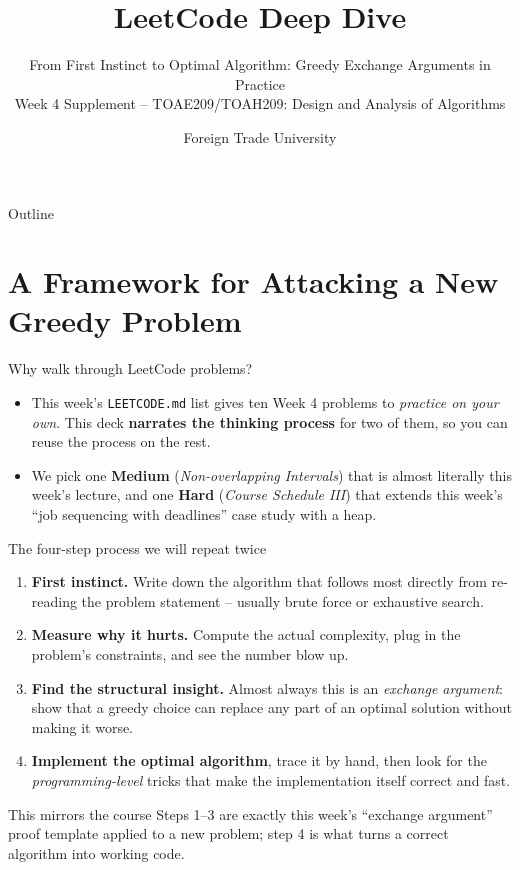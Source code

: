 \documentclass[11pt,aspectratio=169]{beamer}
\title{LeetCode Deep Dive}
\subtitle{From First Instinct to Optimal Algorithm: Greedy Exchange Arguments in Practice\\
\small Week 4 Supplement -- TOAE209/TOAH209: Design and Analysis of Algorithms}
\author{Foreign Trade University}
\date{}
\begin{document}
\begin{frame}
  \titlepage
\end{frame}

\begin{frame}{Outline}
  \tableofcontents
\end{frame}

\section{A Framework for Attacking a New Greedy Problem}

\begin{frame}{Why walk through LeetCode problems?}
  \begin{itemize}
    \item This week's \texttt{LEETCODE.md} list gives ten Week 4 problems to
    \emph{practice on your own}. This deck \textbf{narrates the thinking process} for
    two of them, so you can reuse the process on the rest.
    \item We pick one \textcolor{blue!50!black}{\textbf{Medium}} (\emph{Non-overlapping
    Intervals}) that is almost literally this week's lecture, and one
    \textcolor{red!60!black}{\textbf{Hard}} (\emph{Course Schedule III}) that extends
    this week's ``job sequencing with deadlines'' case study with a heap.
  \end{itemize}
\end{frame}

\begin{frame}{The four-step process we will repeat twice}
  \begin{enumerate}
    \item \textbf{First instinct.} Write down the algorithm that follows most directly
    from re-reading the problem statement -- usually brute force or exhaustive search.
    \item \textbf{Measure why it hurts.} Compute the actual complexity, plug in the
    problem's constraints, and see the number blow up.
    \item \textbf{Find the structural insight.} Almost always this is an
    \emph{exchange argument}: show that a greedy choice can replace any part of an
    optimal solution without making it worse.
    \item \textbf{Implement the optimal algorithm}, trace it by hand, then look for the
    \emph{programming-level} tricks that make the implementation itself correct and
    fast.
  \end{enumerate}
  \begin{alertblock}{This mirrors the course}
    Steps 1--3 are exactly this week's ``exchange argument'' proof template applied to
    a new problem; step 4 is what turns a correct algorithm into working code.
  \end{alertblock}
\end{frame}
\end{document}
